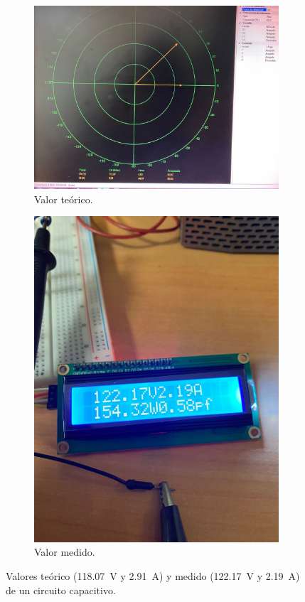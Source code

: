 \begin{figure}[h]
    \centering
    \begin{subfigure}{0.45\textwidth}
        \includegraphics[width=\textwidth]{Imagenes/capacitive.jpg}
        \caption{Valor teórico.}
    \end{subfigure}
    \begin{subfigure}{0.45\textwidth}
        \includegraphics[width=\textwidth]{Imagenes/capacitive_2.jpg} 
        \caption{Valor medido.}
    \end{subfigure}
    \caption{Valores teórico (\SI{118.07}{\volt} y \SI{2.91}{\ampere}) y medido (\SI{122.17}{\volt}
    y \SI{2.19}{\ampere}) de un circuito capacitivo.}
    \label{cap--}
\end{figure}


